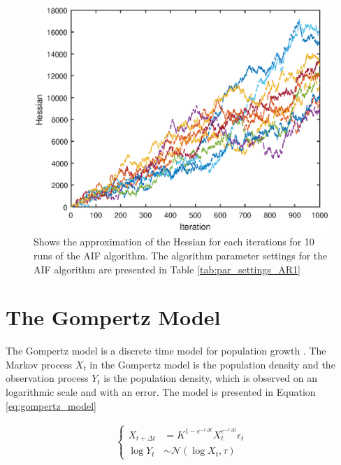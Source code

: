 \documentclass[twoside,openright]{report}
\begin{document}
\begin{figure}[h]
  \centering
    \includegraphics[width=1\textwidth]{./fig_simple_AR1/hessian_approx}
  \caption{Shows the approximation of the Hessian  for each iterations for 10 runs of the AIF algorithm. The algorithm parameter settings for the AIF algorithm are presented in Table \ref{tab:par_settings_AR1} }
  \label{fig:hessian_AR1}
\end{figure}


\section{The Gompertz Model}

The Gompertz model is a discrete time model for population growth \cite{ionides2015inference}. The Markov process $X_t$ in the Gompertz model is the population density and the observation process $Y_t$ is the population density, which is observed on an logarithmic scale and with an error. The model is presented in Equation \ref{eq:gompertz_model}

\begin{align} \label{eq:gompertz_model}
\begin{cases}
    X_{t + \Delta t} &= K^{1-e^{-r \Delta t}} X_{t}^{e^{-r \Delta t}} \epsilon_t \\
    \log Y_t &\sim \mathcal{N} ( \log X_t, \tau )
\end{cases}
\end{align}
\end{document}
